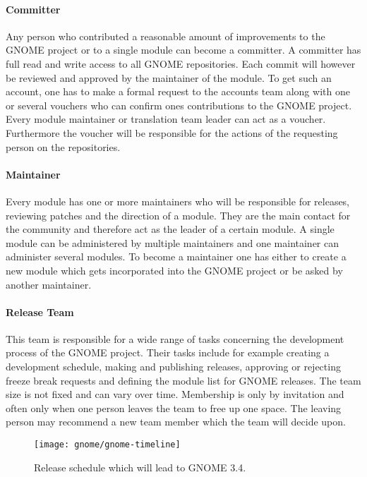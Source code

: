 \paragraph{Committer}

Any person who contributed a reasonable amount of improvements to the GNOME
project or to a single module can become a committer. A committer has full read
and write access to all GNOME repositories. Each commit will however be
reviewed and approved by the maintainer of the module. To get such an account,
one has to make a formal request to the accounts team along with one or several
vouchers who can confirm ones contributions to the GNOME project. Every module
maintainer or translation team leader can act as a voucher. Furthermore the
voucher will be responsible for the actions of the requesting person on the
repositories.

\paragraph{Maintainer}

Every module has one or more maintainers who will be responsible for releases,
reviewing patches and the direction of a module. They are the main contact for
the community and therefore act as the leader of a certain module. A single
module can be administered by multiple maintainers and one maintainer can
administer several modules. To become a maintainer one has either to create a
new module which gets incorporated into the GNOME project or be asked by
another maintainer.

\paragraph{Release Team}

This team is responsible for a wide range of tasks concerning the development
process of the GNOME project. Their tasks include for example creating a
development schedule, making and publishing releases, approving or rejecting
freeze break requests and defining the module list for GNOME releases. The team
size is not fixed and can vary over time. Membership is only by invitation and
often only when one person leaves the team to free up one space. The leaving
person may recommend a new team member which the team will decide upon.

\begin{figure}[htbp]
  \centering
  \texttt{[image: gnome/gnome-timeline]}
  \caption[GNOME 3.4 Release Schedule]{Release schedule which will lead to GNOME 3.4.}
\end{figure}

